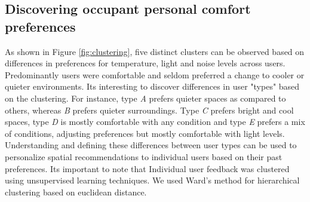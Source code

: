
\subsection{Discovering occupant personal comfort preferences}
 
As shown in Figure \ref{fig:clustering}, five distinct clusters can be observed based on differences in preferences for temperature, light and noise levels across users. Predominantly users were comfortable and seldom preferred a change to cooler or quieter environments. Its interesting to discover differences in user "types" based on the clustering. For instance, type \emph{A} prefers quieter spaces as compared to others, whereas \emph{B} prefers quieter surroundings. Type \emph{C} prefers bright and cool spaces, type \emph{D} is mostly comfortable with any condition and type \emph{E} prefers a mix of conditions, adjusting preferences but mostly comfortable with light levels. Understanding and defining these differences between user types can be used to personalize spatial recommendations to individual users based on their past preferences. Its important to note that Individual user feedback was clustered using unsupervised learning techniques. We used Ward's method for hierarchical clustering based on euclidean distance.\\ 






